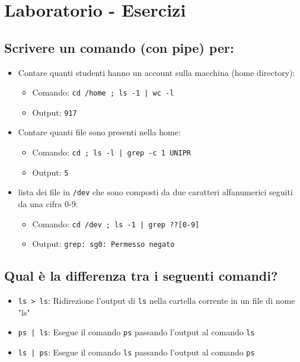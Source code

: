 \documentclass{article}
\begin{document}
\setcounter{section}{1} %
\section{Laboratorio - Esercizi}

\subsection{Scrivere un comando (con pipe) per:}
\begin{itemize}
    \item Contare quanti studenti hanno un account sulla macchina (home directory):
    \begin{itemize}
        \item Comando: \texttt{cd /home ; ls -1 | wc -l}
        \item Output: \texttt{917}
    \end{itemize}
    \item Contare quanti file sono presenti nella home:
    \begin{itemize}
        \item Comando: \texttt{cd ; ls -l | grep -c 1 UNIPR}
        \item Output: \texttt{5}
    \end{itemize}
    \item lista dei file in \texttt{/dev} che sono composti da due caratteri alfanumerici seguiti da una cifra 0-9:
    \begin{itemize}
        \item Comando: \texttt{cd /dev ; ls -1 | grep ??[0-9]}
        \item Output: \texttt{grep: sg0: Permesso negato}
    \end{itemize}
\end{itemize}

\subsection{Qual è la differenza tra i seguenti comandi?}
\begin{itemize}
    \item \texttt{ls > ls}: Ridirezione l'output di \texttt{ls} nella cartella corrente in un file di nome "ls"
    \item \texttt{ps | ls}: Esegue il comando \texttt{ps} passando l'output al comando \texttt{ls}
    \item \texttt{ls | ps}: Esegue il comando \texttt{ls} passando l'output al comando \texttt{ps}
\end{itemize}
\end{document}
